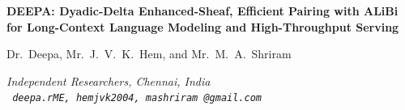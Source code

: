 \documentclass[10pt,a4paper]{article}
\begin{document}
\thispagestyle{plain}

\begin{center}
  {\Large\bfseries DEEPA: Dyadic-Delta Enhanced-Sheaf, Efficient Pairing with ALiBi for Long-Context Language Modeling and High-Throughput Serving\par}
  \vspace{12pt}
  {\normalsize Dr.\ Deepa, Mr.\ J.\ V.\ K.\ Hem, and Mr.\ M.\ A.\ Shriram\par}
  \vspace{6pt}
  {\small\itshape Independent Researchers, Chennai, India\\
  \upshape\texttt{ deepa.rME, hemjvk2004, mashriram @gmail.com}\par}
\end{center}
\vspace{6pt}
\end{document}
